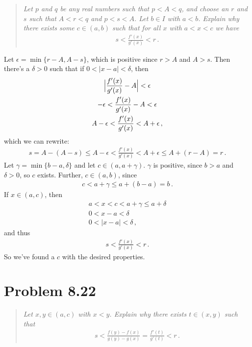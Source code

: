 \documentclass{article}
\begin{document}
\begin{quote}
    \itshape
    Let $p$ and $q$ be any real numbers such that $p < A < q$,
    and choose an $r$ and $s$ such that $A < r < q$ and $p < s <A$.
    Let $b \in I$ with $a < b$. Explain why there exists some $c \in (a,b)$
    such that for all $x$ with $a < x < c$ we have
    \begin{align*}
        s < \frac{f'(x)}{g'(x)} < r \,.
    \end{align*}
\end{quote}

Let $\epsilon = \min\{ r-A, A-s \}$, which is positive since
$r > A$ and $A > s$.
Then there's a $\delta > 0$
such that if $0 < |x-a| < \delta$, then
\begin{gather*}
    \Bigl| \frac{f'(x)}{g'(x)} - A \Bigr| < \epsilon \\
    -\epsilon < \frac{f'(x)}{g'(x)} - A < \epsilon \\
    A-\epsilon < \frac{f'(x)}{g'(x)} < A+\epsilon \,,
\end{gather*}
which we can rewrite:
\begin{align*}
    s = A - (A - s) \leq A-\epsilon < \frac{f'(x)}{g'(x)} < A+\epsilon \leq A + (r-A) = r \,.
\end{align*}
Let $\gamma = \min\{ b-a, \delta \}$ and let $c \in (a, a + \gamma)$.
$\gamma$ is positive, since $b > a$ and $\delta > 0$, so $c$ exists.
Further, $c \in (a, b)$, since
\begin{align*}
    c < a + \gamma \leq a + (b - a) = b \,.
\end{align*}
If $x \in (a, c)$, then
\begin{gather*}
    a < x < c < a + \gamma \leq a + \delta \\
    0 < x - a < \delta \\
    0 < |x-a| < \delta \,,
\end{gather*}
and thus
\begin{align*}
    s < \frac{f'(x)}{g'(x)} < r \,.
\end{align*}
So we've found a $c$ with the desired properties.
\qedsymbol

\section*{Problem 8.22}

\begin{quote}
    \itshape
    Let $x, y \in (a,c)$ with $x < y$. Explain why there exists $t \in (x, y)$
    such that
    \begin{align*}
        s < \frac{f(y) - f(x)}{g(y) - g(x)} = \frac{f'(t)}{g'(t)} < r \,.
    \end{align*}
\end{quote}
\end{document}
